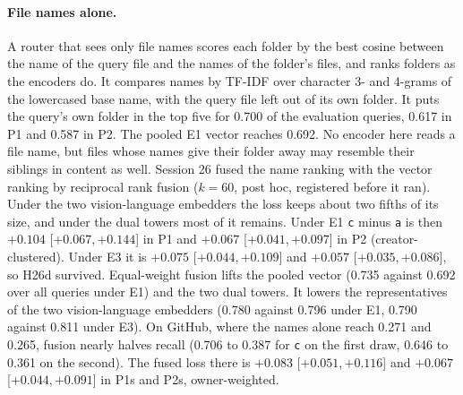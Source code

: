 \documentclass[11pt]{article}
\newcommand{\rep}[1]{\texttt{#1}}
\newcommand{\ci}[2]{[\ensuremath{#1},\,\ensuremath{#2}]}  %
\begin{document}
\paragraph{File names alone.} A router that sees only file names scores each folder by the best cosine between the name of the query file and the names of the folder's files, and ranks folders as the encoders do. It compares names by TF-IDF over character 3- and 4-grams of the lowercased base name, with the query file left out of its own folder. It puts the query's own folder in the top five for 0.700 of the evaluation queries, 0.617 in P1 and 0.587 in P2. The pooled E1 vector reaches 0.692. No encoder here reads a file name, but files whose names give their folder away may resemble their siblings in content as well. Session 26 fused the name ranking with the vector ranking by reciprocal rank fusion ($k = 60$, post hoc, registered before it ran). Under the two vision-language embedders the loss keeps about two fifths of its size, and under the dual towers most of it remains. Under E1 \rep{c} minus \rep{a} is then $+0.104$ \ci{+0.067}{+0.144} in P1 and $+0.067$ \ci{+0.041}{+0.097} in P2 (creator-clustered). Under E3 it is $+0.075$ \ci{+0.044}{+0.109} and $+0.057$ \ci{+0.035}{+0.086}, so H26d survived. Equal-weight fusion lifts the pooled vector (0.735 against 0.692 over all queries under E1) and the two dual towers. It lowers the representatives of the two vision-language embedders (0.780 against 0.796 under E1, 0.790 against 0.811 under E3). On GitHub, where the names alone reach 0.271 and 0.265, fusion nearly halves recall (0.706 to 0.387 for \rep{c} on the first draw, 0.646 to 0.361 on the second). The fused loss there is $+0.083$ \ci{+0.051}{+0.116} and $+0.067$ \ci{+0.044}{+0.091} in P1s and P2s, owner-weighted.
\end{document}
